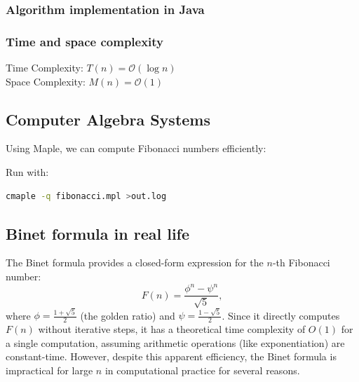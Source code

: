 \documentclass{article}
\begin{document}
\subsubsection{Algorithm implementation in Java}


\subsubsection{Time and space complexity}
Time Complexity: $T(n) = \mathcal{O}(\log n)$ \\
Space Complexity: $M(n) = \mathcal{O}(1)$

\subsection{Computer Algebra Systems}
Using Maple, we can compute Fibonacci numbers efficiently:

Run with:
\begin{lstlisting}[language=bash]
cmaple -q fibonacci.mpl >out.log
\end{lstlisting}

\subsection{Binet formula in real life}

The Binet formula provides a closed-form expression for the \(n\)-th Fibonacci number:
\[
F(n) = \frac{\phi^n - \psi^n}{\sqrt{5}},
\]
where \(\phi = \frac{1 + \sqrt{5}}{2}\) (the golden ratio) and \(\psi = \frac{1 - \sqrt{5}}{2}\). Since it directly computes \(F(n)\) without iterative steps, it has a theoretical time complexity of \(O(1)\) for a single computation, assuming arithmetic operations (like exponentiation) are constant-time. However, despite this apparent efficiency, the Binet formula is impractical for large \(n\) in computational practice for several reasons.
\end{document}
